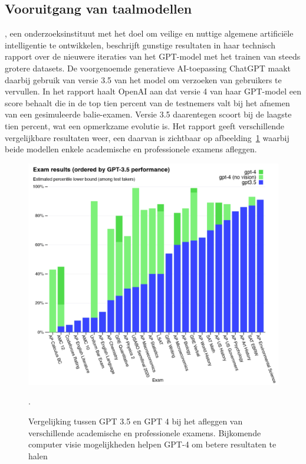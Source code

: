 \subsection{Vooruitgang van taalmodellen}
\label{subsec:vooruitgang-van-taalmodellen}
\textcite{OpenAI2023}, een onderzoeksinstituut met het doel om veilige en nuttige algemene artifici\"ele intelligentie te ontwikkelen, beschrijft gunstige resultaten in haar technisch rapport over de nieuwere iteraties van het GPT-model met het trainen van steeds grotere datasets.
De voorgenoemde generatieve AI-toepassing ChatGPT maakt daarbij gebruik van versie 3.5 van het model om verzoeken van gebruikers te vervullen.
In het rapport haalt OpenAI aan dat versie 4 van haar GPT-model een score behaalt die in de top tien percent van de testnemers valt bij het afnemen van een gesimuleerde balie-examen.
Versie 3.5 daarentegen scoort bij de laagste tien percent, wat een opmerkzame evolutie is.
Het rapport geeft verschillende vergelijkbare resultaten weer, een daarvan is zichtbaar op afbeelding~\ref{fig:gpt3.5-versus-4} waarbij beide modellen enkele academische en professionele examens afleggen.
\begin{figure}
    \includegraphics[width=1\linewidth]{images/gpt35-vs-4-exam-results}
    \caption{Vergelijking tussen GPT 3.5 en GPT 4 bij het afleggen van verschillende academische en professionele examens. Bijkomende computer visie mogelijkheden helpen GPT-4 om betere resultaten te halen~\autocite{OpenAI2023}}.
    \label{fig:gpt3.5-versus-4}
\end{figure}

